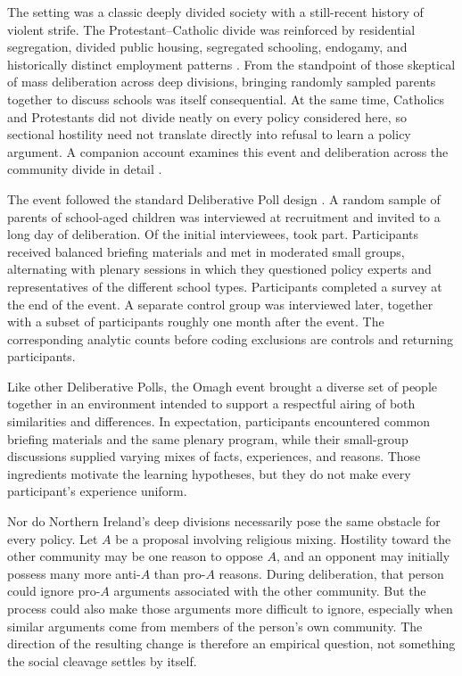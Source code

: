 \documentclass[11pt]{article}
\begin{document}
The setting was a classic deeply divided society with a still-recent history of violent strife.
The Protestant--Catholic divide was reinforced by residential segregation, divided public
housing, segregated schooling, endogamy, and historically distinct employment patterns
\citep{boyle1994northern,ohara2004self,cohen2007stop,pogatchnik2008despite}. From the
standpoint of those skeptical of mass deliberation across deep divisions, bringing randomly
sampled parents together to discuss schools was itself consequential. At the same time,
Catholics and Protestants did not divide neatly on every policy considered here, so sectional
hostility need not translate directly into refusal to learn a policy argument. A companion
account examines this event and deliberation across the community divide in detail
\citep{luskin2014deep}.

The event followed the standard Deliberative Poll design
\citep{fishkin1991democracy,luskin2002better,luskin2002considered,fishkin2009people}. A random sample of parents of school-aged
children was interviewed at recruitment and invited to a long day of deliberation. Of the
\RecruitmentN{} initial interviewees, \ParticipantTtwoFullN{} took part. Participants received
balanced briefing materials and met in moderated small groups, alternating with plenary
sessions in which they questioned policy experts and representatives of the different school
types. Participants completed a survey at the end of the event. A separate control group was
interviewed later, together with a subset of participants roughly one month after the event.
The corresponding analytic counts before coding exclusions are \ControlFullN{} controls and
\ParticipantTthreeFullN{} returning participants.

Like other Deliberative Polls, the Omagh event brought a diverse set of people together in an
environment intended to support a respectful airing of both similarities and differences. In
expectation, participants encountered common briefing materials and the same plenary program,
while their small-group discussions supplied varying mixes of facts, experiences, and reasons.
Those ingredients motivate the learning hypotheses, but they do not make every participant's
experience uniform.

Nor do Northern Ireland's deep divisions necessarily pose the same obstacle for every policy.
Let $A$ be a proposal involving religious mixing. Hostility toward the other community may be
one reason to oppose $A$, and an opponent may initially possess many more anti-$A$ than
pro-$A$ reasons. During deliberation, that person could ignore pro-$A$ arguments associated
with the other community. But the process could also make those arguments more difficult to
ignore, especially when similar arguments come from members of the person's own community.
The direction of the resulting change is therefore an empirical question, not something the
social cleavage settles by itself.
\end{document}
